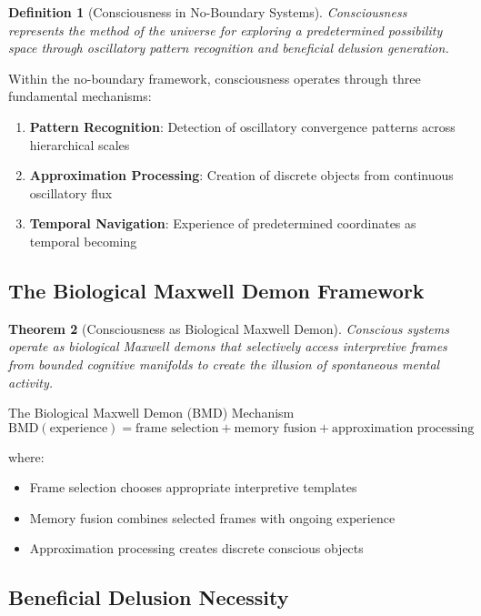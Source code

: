\documentclass[11pt,a4paper]{article}
\newtheorem{theorem}{Theorem}[section]
\newtheorem{definition}[theorem]{Definition}
\theoremstyle{remark}
\begin{document}
\begin{definition}[Consciousness in No-Boundary Systems]
Consciousness represents the method of the universe for exploring a predetermined possibility space through oscillatory pattern recognition and beneficial delusion generation.
\end{definition}

Within the no-boundary framework, consciousness operates through three fundamental mechanisms:

\begin{enumerate}
\item \textbf{Pattern Recognition}: Detection of oscillatory convergence patterns across hierarchical scales
\item \textbf{Approximation Processing}: Creation of discrete objects from continuous oscillatory flux
\item \textbf{Temporal Navigation}: Experience of predetermined coordinates as temporal becoming
\end{enumerate}

\subsection{The Biological Maxwell Demon Framework}

\begin{theorem}[Consciousness as Biological Maxwell Demon]
Conscious systems operate as biological Maxwell demons that selectively access interpretive frames from bounded cognitive manifolds to create the illusion of spontaneous mental activity.
\end{theorem}

The Biological Maxwell Demon (BMD) Mechanism
\begin{equation}
\text{BMD}(\text{experience}) = \text{frame selection} + \text{memory fusion} + \text{approximation processing}
\end{equation}

where:
\begin{itemize}
\item Frame selection chooses appropriate interpretive templates
\item Memory fusion combines selected frames with ongoing experience  
\item Approximation processing creates discrete conscious objects
\end{itemize}

\subsection{Beneficial Delusion Necessity}
\end{document}
